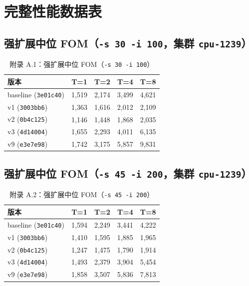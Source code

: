\documentclass[UTF8,12pt,a4paper]{ctexart}
\begin{document}
\appendix
\section{完整性能数据表}

\subsection{强扩展中位 FOM（\texttt{-s 30 -i 100}，集群 \texttt{cpu-1239}）}

\begin{table}[H]
\centering
\begin{tabular}{lrrrr}
\toprule
\textbf{版本} & \textbf{T=1} & \textbf{T=2} & \textbf{T=4} & \textbf{T=8} \\
\midrule
baseline (\texttt{3e01c40}) & 1,519 & 2,174 & 3,499 & 4,621 \\
v1 (\texttt{3003bb6})       & 1,363 & 1,616 & 2,012 & 2,109 \\
v2 (\texttt{0b4c125})       & 1,146 & 1,448 & 1,868 & 2,035 \\
v3 (\texttt{4d14004})       & 1,655 & 2,293 & 4,011 & 6,135 \\
v9 (\texttt{e3e7e98})       & 1,742 & 3,175 & 5,857 & 9,831 \\
\bottomrule
\end{tabular}
\caption{附录 A.1：强扩展中位 FOM（\texttt{-s 30 -i 100}）}
\end{table}

\subsection{强扩展中位 FOM（\texttt{-s 45 -i 200}，集群 \texttt{cpu-1239}）}

\begin{table}[H]
\centering
\begin{tabular}{lrrrr}
\toprule
\textbf{版本} & \textbf{T=1} & \textbf{T=2} & \textbf{T=4} & \textbf{T=8} \\
\midrule
baseline (\texttt{3e01c40}) & 1,594 & 2,249 & 3,441 & 4,222 \\
v1 (\texttt{3003bb6})       & 1,410 & 1,595 & 1,885 & 1,965 \\
v2 (\texttt{0b4c125})       & 1,247 & 1,475 & 1,790 & 1,914 \\
v3 (\texttt{4d14004})       & 1,493 & 2,379 & 3,904 & 5,454 \\
v9 (\texttt{e3e7e98})       & 1,858 & 3,507 & 5,836 & 7,813 \\
\bottomrule
\end{tabular}
\caption{附录 A.2：强扩展中位 FOM（\texttt{-s 45 -i 200}）}
\end{table}
\end{document}
